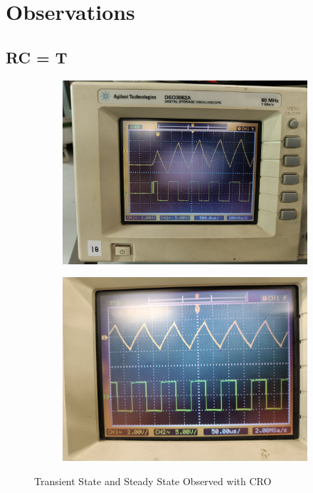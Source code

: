 \documentclass[journal]{IEEEtran}
\begin{document}
\section{Observations}

\subsection{RC = T}

\begin{figure}[!h]
    \centering
    \begin{subfigure}[t]{0.4\textwidth}
        \centering
        \includegraphics[width=1\columnwidth]{pics/6109622319392604816.jpg}
    \end{subfigure}
    \begin{subfigure}[t]{0.4\textwidth}
        \centering
        \includegraphics[width=1\columnwidth]{pics/6109622319392604812.jpg}
    \end{subfigure}
    \caption{Transient State and Steady State Observed with CRO}
\end{figure}
\end{document}
